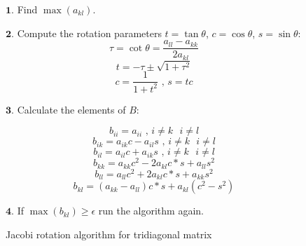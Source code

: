 \documentclass[11pt]{article}
\begin{document}
\begin{figure}[ht]\label{Jacobi rotation algorithm}
\begin{framed}
\begin{minipage}[b]{0.45\linewidth}

\begin{flushleft}
$\boldsymbol{1.}$ Find $\max (a_{kl})$.
\end{flushleft}

\begin{flushleft}
$\boldsymbol{2.}$ Compute the rotation parameters $t = \tan \theta$, $c = \cos \theta$, $s = \sin \theta$:
\begin{equation}
\tau = \cot \theta = \frac{a_{ll} - a_{kk}}{2 a_{kl}}
\end{equation}
\begin{equation}
t = - \tau \pm \sqrt{1 + \tau^2}
\end{equation}
\begin{equation}
c = \frac{1}{1 + t^2} \text{ , } s = tc
\end{equation}
\end{flushleft}

\end{minipage}
\hspace{0.5cm}
\begin{minipage}[b]{0.45\linewidth}

\centering

\begin{flushleft}
$\boldsymbol{3.}$ Calculate the elements of $B$:

\begin{equation*}
b_{ii} = a_{ii} \text{ , } i \neq k \text{ } i \neq l
\end{equation*}
\begin{equation*}
b_{ik} = a_{ik} c - a_{il} s \text{ , } i \neq k \text{ } i \neq l
\end{equation*}
\begin{equation*}
b_{il} = a_{il} c + a_{ik} s \text{ , } i \neq k \text{ } i \neq l
\end{equation*}
\begin{equation*}
b_{kk} = a_{kk} c^2 - 2 a_{kl} c*s + a_{ll} s^2
\end{equation*}
\begin{equation*}
b_{ll} = a_{ll} c^2 + 2 a_{kl} c*s + a_{kk} s^2
\end{equation*}
\begin{equation*}
b_{kl} = (a_{kk} - a_{ll}) c*s + a_{kl}(c^2 - s^2)
\end{equation*}
\end{flushleft}

\begin{flushleft}
$\boldsymbol{4.}$ If $\max (b_{kl}) \geq \epsilon$ run the algorithm again.
\end{flushleft}

\end{minipage}
\end{framed}
\caption{Jacobi rotation algorithm for tridiagonal matrix}
\end{figure}
\end{document}
